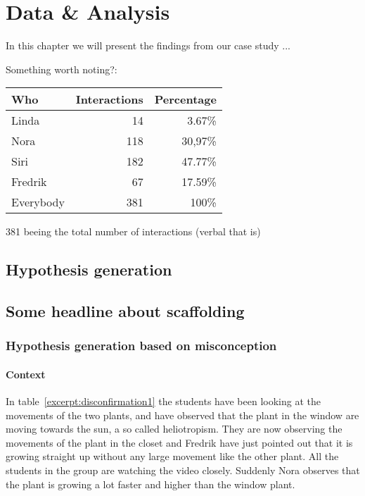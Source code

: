 \chapter{Data \& Analysis}
In this chapter we will present the findings from our case study ...

Something worth noting?:
\begin{table}[H]
\begin{center}
	\begin{tabular}{l r r } \toprule
	Who &  Interactions  & Percentage\\ \midrule  
	Linda &	 14  & 3.67\% \\
	Nora&	118 & 30,97\% \\ 
	Siri& 	182 & 47.77\% \\
	Fredrik& 67 & 17.59\% \\ \midrule
	Everybody &	381 & 100\%\\
	\bottomrule
	\end{tabular}
\end{center}
\end{table}
381 beeing the total number of interactions (verbal that is)

\section{Hypothesis generation}


\section{Some headline about scaffolding}

\subsection{Hypothesis generation based on misconception}


\subsubsection*{Context}
In table~\ref{excerpt:disconfirmation1} the students have been looking at the movements of the two plants, and have observed that the plant in the window are moving towards the sun, a so called heliotropism. They are now observing the movements of the plant in the closet and Fredrik have just pointed out that it is growing straight up without any large movement like the other plant. All the students in the group are watching the video closely. Suddenly Nora observes that the plant is growing a lot faster and higher than the window plant.


